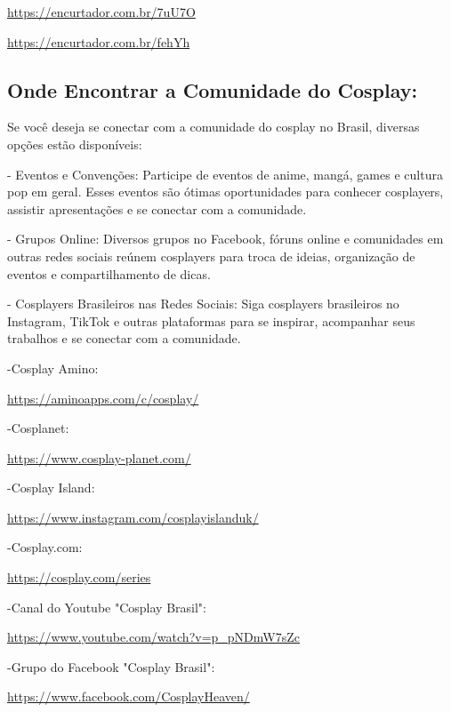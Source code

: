 \documentclass[12pt,a4paper,chapter=TITLE,section=TITLE,subsection=TITLE,subsubsection=TITLE]{article}
\begin{document}
\url{https://encurtador.com.br/7uU7O}

\url{https://encurtador.com.br/fehYh}

\subsection{Onde Encontrar a Comunidade do Cosplay:}

Se você deseja se conectar com a comunidade do cosplay no Brasil, diversas opções estão disponíveis:

- Eventos e Convenções: Participe de eventos de anime, mangá, games e cultura pop em geral. Esses eventos são ótimas oportunidades para conhecer cosplayers, assistir apresentações e se conectar com a comunidade.

- Grupos Online: Diversos grupos no Facebook, fóruns online e comunidades em outras redes sociais reúnem cosplayers para troca de ideias, organização de eventos e compartilhamento de dicas.

- Cosplayers Brasileiros nas Redes Sociais: Siga cosplayers brasileiros no Instagram, TikTok e outras plataformas para se inspirar, acompanhar seus trabalhos e se conectar com a comunidade.



-Cosplay Amino: 

\url{https://aminoapps.com/c/cosplay/}


-Cosplanet: 

\url{https://www.cosplay-planet.com/}


-Cosplay Island: 

\url{https://www.instagram.com/cosplayislanduk/}


-Cosplay.com:

\url{https://cosplay.com/series}


-Canal do Youtube "Cosplay Brasil": 

\url{https://www.youtube.com/watch?v=p_pNDmW7sZc}


-Grupo do Facebook "Cosplay Brasil": 

\url{https://www.facebook.com/CosplayHeaven/}
\end{document}
